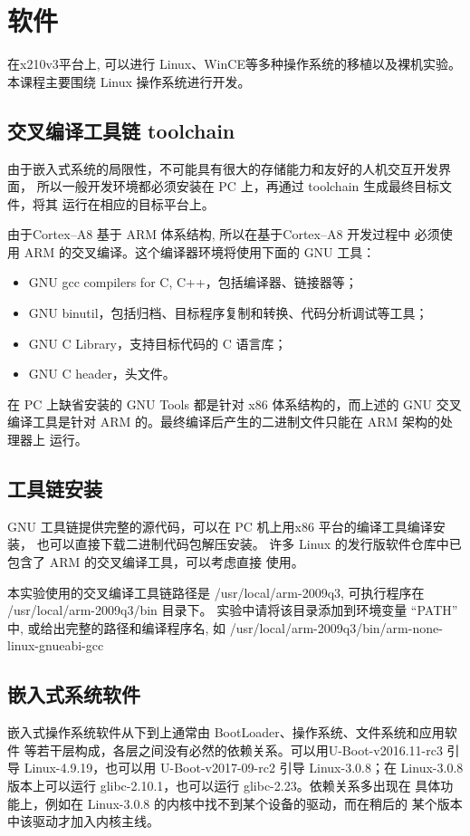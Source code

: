 \section{软件}

在x210v3平台上, 可以进行 Linux、WinCE等多种操作系统的移植以及裸机实验。
本课程主要围绕 Linux 操作系统进行开发。

\subsection{交叉编译工具链 toolchain}
由于嵌入式系统的局限性，不可能具有很大的存储能力和友好的人机交互开发界面，
所以一般开发环境都必须安装在 PC 上，再通过 toolchain 生成最终目标文件，将其
运行在相应的目标平台上。

由于Cortex--A8 基于 ARM 体系结构, 所以在基于Cortex--A8 开发过程中
必须使用 ARM 的交叉编译。这个编译器环境将使用下面的 GNU 工具：
\begin{itemize}
  \item GNU gcc compilers for C, C++，包括编译器、链接器等；
  \item GNU binutil，包括归档、目标程序复制和转换、代码分析调试等工具；
  \item GNU C Library，支持目标代码的 C 语言库；
  \item GNU C header，头文件。
\end{itemize}
在 PC 上缺省安装的 GNU Tools 都是针对 x86 体系结构的，而上述的 GNU 交叉
编译工具是针对 ARM 的。最终编译后产生的二进制文件只能在 ARM 架构的处理器上
运行。

\subsection{工具链安装}
GNU 工具链提供完整的源代码，可以在 PC 机上用x86 平台的编译工具编译安装，
也可以直接下载二进制代码包解压安装。
许多 Linux 的发行版软件仓库中已包含了 ARM 的交叉编译工具，可以考虑直接
使用。

本实验使用的交叉编译工具链路径是 /usr/local/arm-2009q3, 可执行程序在
 /usr/local/arm-2009q3/bin 目录下。 实验中请将该目录添加到环境变量 ``PATH''
中, 或给出完整的路径和编译程序名, 如
/usr/local/arm-2009q3/bin/arm-none-linux-gnueabi-gcc

\subsection{嵌入式系统软件}
嵌入式操作系统软件从下到上通常由 BootLoader、操作系统、文件系统和应用软件
等若干层构成，各层之间没有必然的依赖关系。可以用U-Boot-v2016.11-rc3 引导
Linux-4.9.19，也可以用 U-Boot-v2017-09-rc2 引导 Linux-3.0.8；在 Linux-3.0.8
版本上可以运行 glibc-2.10.1，也可以运行 glibc-2.23。依赖关系多出现在
具体功能上，例如在 Linux-3.0.8 的内核中找不到某个设备的驱动，而在稍后的
某个版本中该驱动才加入内核主线。


